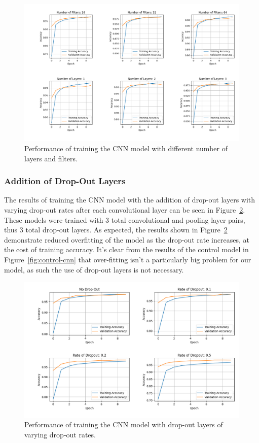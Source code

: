 \documentclass[a4paper]{article}
\begin{document}
\begin{figure}[h!]
    \centering
    \includegraphics[scale=0.45]{images/n-layers-n-filters-cnn.png}
    \caption{Performance of training the CNN model with different number of layers and filters.}
    \label{fig:layers-filters}
\end{figure}

\subsubsection{Addition of Drop-Out Layers}

The results of training the CNN model with the addition of drop-out layers with varying drop-out rates after each convolutional layer can be seen in Figure~\ref{fig:drop-out}. These models were trained with 3 total convolutional and pooling layer pairs, thus 3 total drop-out layers. As expected, the results shown in Figure~\ref{fig:drop-out} demonstrate reduced overfitting of the model as the drop-out rate increases, at the cost of training accuracy. It's clear from the results of the control model in Figure~\ref{fig:control-cnn} that over-fitting isn't a particularly big problem for our model, as such the use of drop-out layers is not necessary. 

\begin{figure}[h!]
    \centering
    \includegraphics[scale=0.5]{images/drop-out-cnn.png}
    \caption{Performance of training the CNN model with drop-out layers of varying drop-out rates.}
    \label{fig:drop-out}
\end{figure}
\end{document}
